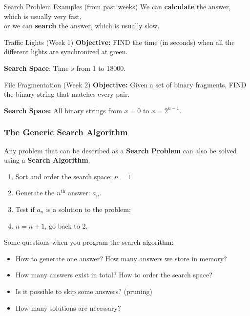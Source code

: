 \begin{frame}{Search Problem Examples (from past weeks)}
  We can {\bf calculate} the answer, which is usually very fast,\\
   or we can {\bf search} the answer, which is usually slow.

  \begin{block}{Traffic Lights (Week 1)}
    {\bf Objective:} FIND the time (in seconds) when all the different lights are synchronized at green.
    \bigskip

    {\bf Search Space}: Time $s$ from 1 to 18000.
  \end{block}

  \begin{block}{File Fragmentation (Week 2)}
    {\bf Objective:} Given a set of binary fragments, FIND the binary string that matches every pair.
    \bigskip

    {\bf Search Space:} All binary strings from $x = 0$ to $x = 2^{n-1}$.
  \end{block}
\end{frame}


\begin{frame}
  \frametitle{The Generic Search Algorithm}
  Any problem that can be described as a {\bf Search Problem} can also be solved using a {\bf Search Algorithm}.
  \begin{enumerate}
    \item Sort and order the search space; $n = 1$
    \item Generate the $n^{\text{th}}$ answer: $a_n$.
    \item Test if $a_n$ is a solution to the problem;
    \item $n = n+1$, go back to 2.
  \end{enumerate}\bigskip

  Some questions when you program the search algorithm:
  \begin{itemize}
  \item How to generate one answer? How many answers we store in memory?
  \item How many answers exist in total? How to order the search space?
  \item Is it possible to skip some answers? (pruning)
  \item How many solutions are necessary?
  \end{itemize}
\end{frame}

